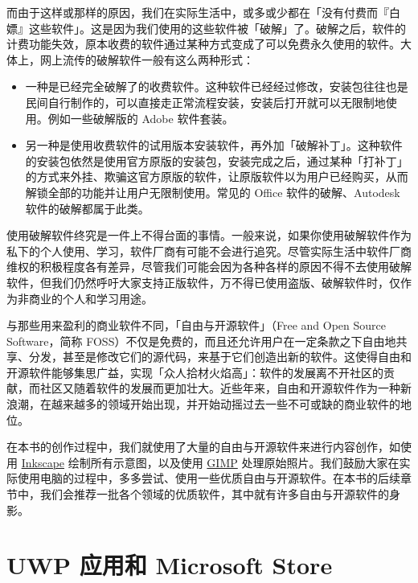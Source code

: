 {{而由于这样或那样的原因，我们在实际生活中，或多或少都在「没有付费而『白嫖』这些软件」。这是因为我们使用的这些软件被「破解」了。破解之后，软件的计费功能失效，原本收费的软件通过某种方式变成了可以免费永久使用的软件。大体上，网上流传的破解软件一般有这么两种形式：

\begin{itemize}
  \item 一种是已经完全破解了的收费软件。这种软件已经经过修改，安装包往往也是民间自行制作的，可以直接走正常流程安装，安装后打开就可以无限制地使用。例如一些破解版的 Adobe 软件套装。
\end{itemize}

\begin{itemize}
  \item 另一种是使用收费软件的试用版本安装软件，再外加「破解补丁」。这种软件的安装包依然是使用官方原版的安装包，安装完成之后，通过某种「打补丁」的方式来外挂、欺骗这官方原版的软件，让原版软件以为用户已经购买，从而解锁全部的功能并让用户无限制使用。常见的 Office 软件的破解、Autodesk 软件的破解都属于此类。
\end{itemize}

使用破解软件终究是一件上不得台面的事情。一般来说，如果你使用破解软件作为私下的个人使用、学习，软件厂商有可能不会进行追究。尽管实际生活中软件厂商维权的积极程度各有差异，尽管我们可能会因为各种各样的原因不得不去使用破解软件，但我们仍然呼吁大家支持正版软件，万不得已使用盗版、破解软件时，仅作为非商业的个人和学习用途。

与那些用来盈利的商业软件不同，「自由与开源软件」（Free and Open Source Software，简称 FOSS）不仅是免费的，而且还允许用户在一定条款之下自由地共享、分发，甚至是修改它们的源代码，来基于它们创造出新的软件。这使得自由和开源软件能够集思广益，实现「众人拾材火焰高」：软件的发展离不开社区的贡献，而社区又随着软件的发展而更加壮大。近些年来，自由和开源软件作为一种新浪潮，在越来越多的领域开始出现，并开始动摇过去一些不可或缺的商业软件的地位。

在本书的创作过程中，我们就使用了大量的自由与开源软件来进行内容创作，如使用 \href{https://inkscape.org/}{Inkscape} 绘制所有示意图，以及使用 \href{https://www.gimp.org/}{GIMP} 处理原始照片。我们鼓励大家在实际使用电脑的过程中，多多尝试、使用一些优质自由与开源软件。在本书的后续章节中，我们会推荐一批各个领域的优质软件，其中就有许多自由与开源软件的身影。

\section{UWP 应用和 Microsoft Store}

}}
